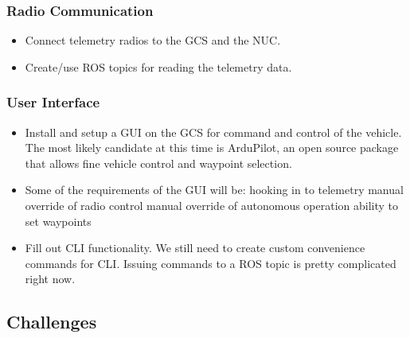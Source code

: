 \documentclass[compsoc,draftclsnofoot,onecolumn,10pt]{IEEEtran}
\begin{document}
\subsubsection{Radio Communication}
\begin{itemize}
	\item Connect telemetry radios to the GCS and the NUC.
	\item Create/use ROS topics for reading the telemetry data.
\end{itemize}

\subsubsection{User Interface}
\begin{itemize}
	\item Install and setup a GUI on the GCS for command and control of the vehicle. The most likely candidate at this time is ArduPilot, an open source package that allows fine vehicle control and waypoint selection.
	\item Some of the requirements of the GUI will be:
	\subitem hooking in to telemetry
	\subitem manual override of radio control
	\subitem manual override of autonomous operation
	\subitem ability to set waypoints
	
	\item Fill out CLI functionality. We still need to create custom convenience commands for CLI. Issuing commands to a ROS topic is pretty complicated right now.\par
\end{itemize}

\subsection{Challenges}
\end{document}
